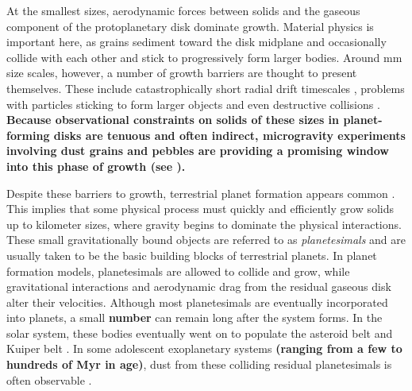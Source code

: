 At the smallest sizes, aerodynamic forces between solids and the gaseous component of the protoplanetary disk dominate growth. Material physics is important here, as grains sediment toward the disk midplane and occasionally collide with each other and stick \cite{okuzumi12, windmark12, garaud13, katoka13} to progressively form larger bodies.  Around mm size scales, however, a number of growth barriers are thought to present themselves. These include catastrophically short radial drift timescales \cite{adachi76, weidenschilling77}, problems with particles sticking to form larger objects and even destructive collisions \cite{windmark12}. \textbf{Because observational constraints on solids of these sizes in planet-forming disks are tenuous and often indirect, microgravity experiments involving dust grains and pebbles are providing a promising window into this phase of growth (see \cite{wurm21}).}

Despite these barriers to growth, terrestrial planet formation appears common \cite{bonfils13, dressing15, gaidos16}. This implies that some physical process must quickly and efficiently grow solids up to kilometer sizes, where gravity begins to dominate the physical interactions. These small gravitationally bound objects are referred to as \textit{planetesimals} and are usually taken to be the basic building blocks of terrestrial planets. In planet formation models, planetesimals are allowed to collide and grow, while gravitational interactions and aerodynamic drag from the residual gaseous disk alter their velocities. Although most planetesimals are eventually incorporated into planets, a small \textbf{number} can remain long after the system forms. In the solar system, these bodies eventually went on to populate the asteroid belt and Kuiper belt \cite{duncan89, bottke05, levison08, morbidelli09}. In some adolescent exoplanetary systems \textbf{(ranging from a few \cite{espaillat17} to hundreds \cite{mamajek12} of Myr in age)}, dust from these colliding residual planetesimals is often observable \cite{wyatt08, gaspar20}.

